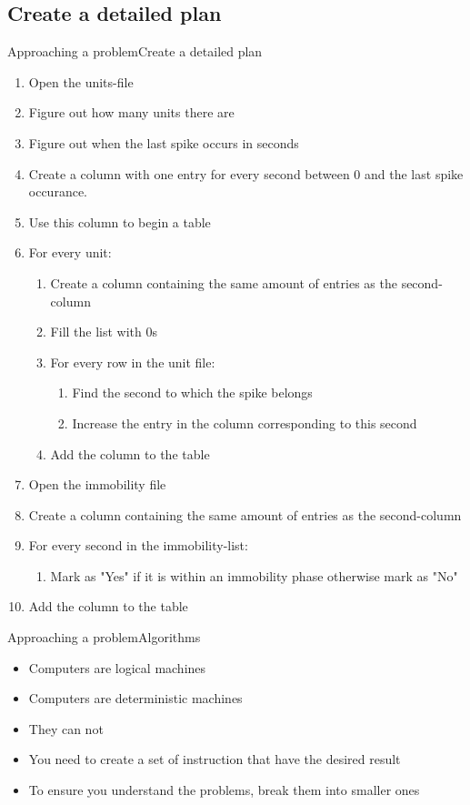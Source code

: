 \documentclass[aspectratio=169]{beamer}
\begin{document}
\subsection{Create a detailed plan}
\begin{frame}{Approaching a problem}{Create a detailed plan}
\begin{enumerate}
\item {Open the units-file}
\item {Figure out how many units there are}
\item {Figure out when the last spike occurs in seconds}
\item {Create a column with one entry for every second between 0 and the last spike occurance.}
\item {Use this column to begin a table}
\item {For every unit:}
\begin{enumerate}
	\item {Create a column containing the same amount of entries as the second-column}
	\item {Fill the list with 0s}
	\item {For every row in the unit file:}
	\begin{enumerate}
		\item {Find the second to which the spike belongs}
		\item {Increase the entry in the column corresponding to this second}
	\end{enumerate}
\item {Add the column to the table}
\end{enumerate}
\item {Open the immobility file}
\item {Create a column containing the same amount of entries as the second-column}
\item {For every second in the immobility-list:}
\begin{enumerate}
	\item {Mark as "Yes" if it is within an immobility phase otherwise mark as "No"}
\end{enumerate}
\item {Add the column to the table}
\end{enumerate}
\end{frame}

\begin{frame}{Approaching a problem}{Algorithms}
\begin{itemize}
	\item Computers are logical machines
	\item Computers are deterministic machines
	\item They can not 
	\item You need to create a set of instruction that have the desired result
	\item To ensure you understand the problems, break them into smaller ones
\end{itemize}
\end{frame}
\end{document}
